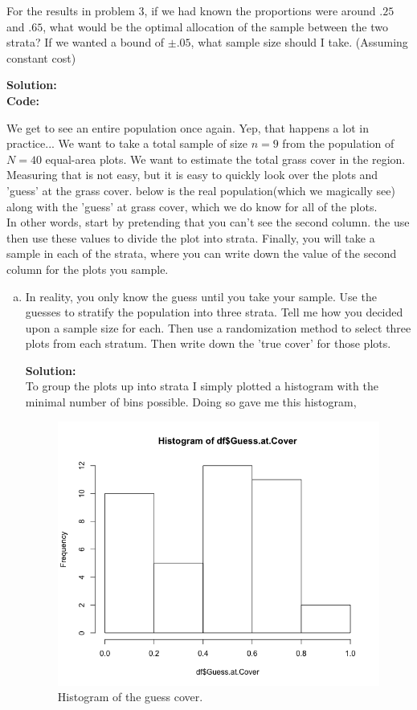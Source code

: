 \documentclass[12pt]{article}
\makeatletter
\theoremstyle{homework}
\newenvironment{exercise}[1]
{\def\@currentlabel{#1}\exercisecore}
{\endexercisecore}
\newcommand{\localhead}[1]{\par\smallskip\noindent\textbf{#1}\nobreak\\}%
\newcommand\solution{\localhead{Solution:}}
\makeatother
\begin{document}
\begin{exercise}{4} For the results in problem 3, if we had known the proportions were around
    $.25$ and $.65$, what would be the optimal allocation of the sample between the two strata?
    If we wanted a bound of $\pm .05$, what sample size should I take. (Assuming constant cost)\\
    \solution 
    \textbf{Code:}
        \begin{center}
            
        \end{center}
\end{exercise}
\vspace{1in}


\begin{exercise}{5} We get to see an entire population once again. Yep, that happens
    a lot in practice... We want to take a total sample of size $n = 9$ from the population of 
    $N = 40$ equal-area plots. We want to estimate the total grass cover in the region. Measuring
    that is not easy, but it is easy to quickly look over the plots and 'guess' at the grass cover.
    below is the real population(which we magically see) along with the 'guess' at grass cover, which we 
    do know for all of the plots.\\
    In other words, start by pretending that you can't see the second column. the use then use these values
    to divide the plot into strata. Finally, you will take a sample in each of the strata, where you can 
    write down the value of the second column for the plots you sample.\\
    \begin{enumerate}[a.]
        \item In reality, you only know the guess until you take your sample. Use the guesses to stratify
        the population into three strata. Tell me how you decided upon a sample size for each. Then use a 
        randomization method to select three plots from each stratum. Then write down the 'true cover'
        for those plots.\\
        \solution To group the plots up into strata I simply plotted a histogram with the minimal number of 
        bins possible. Doing so gave me this histogram,
        \begin{figure}[H]
            \begin{center}
            \caption{Histogram of the guess cover.}
            \includegraphics[width=.70\textwidth]{Rplot01.png}

\end{center}
\end{figure}
\end{enumerate}
\end{exercise}
\end{document}
